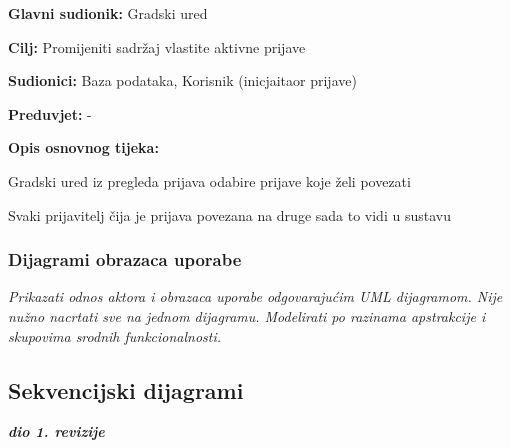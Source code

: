 					\noindent {}
					\begin{packed_item}
	
						\item \textbf{Glavni sudionik: }Gradski ured
						\item  \textbf{Cilj:} Promijeniti sadržaj vlastite aktivne prijave
						\item  \textbf{Sudionici:} Baza podataka, Korisnik (inicjaitaor prijave)
						\item  \textbf{Preduvjet:} -
						\item  \textbf{Opis osnovnog tijeka:}
						
						\item[] \begin{packed_enum}
	
							\item Gradski ured iz pregleda prijava odabire prijave koje želi povezati
							\item Svaki prijavitelj čija je prijava povezana na druge sada to vidi u sustavu
						\end{packed_enum}
						
					\end{packed_item}
					
					
				
				
					
				\subsubsection{Dijagrami obrazaca uporabe}
					
					\textit{Prikazati odnos aktora i obrazaca uporabe odgovarajućim UML dijagramom. Nije nužno nacrtati sve na jednom dijagramu. Modelirati po razinama apstrakcije i skupovima srodnih funkcionalnosti.}
				\eject		
				
			\subsection{Sekvencijski dijagrami}
				
				\textbf{\textit{dio 1. revizije}}\\
				
